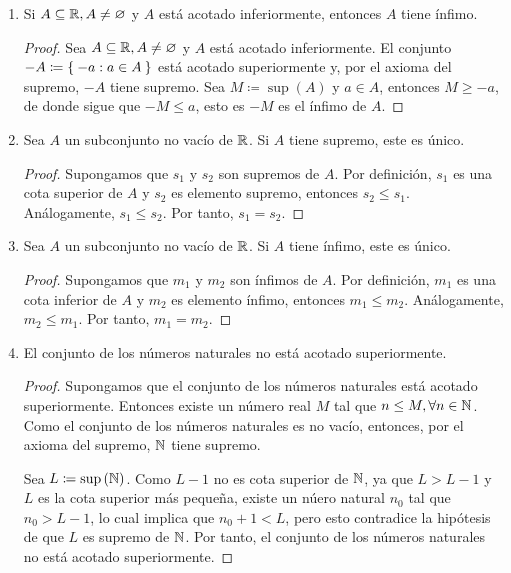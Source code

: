 \begin{enumerate}[label=\alph*)]
  \item Si $A\subseteq \mathbb{R}, A\neq \varnothing$ y $A$ está acotado inferiormente, entonces $A$ tiene ínfimo.
  \begin{proof}\leavevmode
    Sea $A\subseteq \mathbb{R}, A\neq \varnothing$ y $A$ está acotado inferiormente. El conjunto $-A \coloneqq \Set{-a: a\in A}$ está acotado superiormente y, por el axioma del supremo, $-A$ tiene supremo. Sea $M\coloneqq \sup{(A)}$ y $a\in A$, entonces $M\geq -a$, de donde sigue que $-M\leq a$, esto es $-M$ es el ínfimo de $A$.
  \end{proof}
  
  \item Sea $A$ un subconjunto no vacío de $\mathbb{R}$. Si $A$ tiene supremo, este es único.
 
  \begin{proof} 
   Supongamos que $s_1$ y $s_2$ son supremos de $A$. Por definición, $s_1$ es una cota superior de $A$ y $s_2$ es elemento supremo, entonces $s_2\leq s_1$. Análogamente, $s_1\leq s_2$. Por tanto, $s_1=s_2$.
  \end{proof}
 
  \item Sea $A$ un subconjunto no vacío de $\mathbb{R}$. Si $A$ tiene ínfimo, este es único.
  
  \begin{proof} 
   Supongamos que $m_1$ y $m_2$ son ínfimos de $A$. Por definición, $m_1$ es una cota inferior de $A$ y $m_2$ es elemento ínfimo, entonces $m_1\leq m_2$. Análogamente, $m_2\leq m_1$. Por tanto, $m_1=m_2$. 
  \end{proof}
  
  \item El conjunto de los números naturales no está acotado superiormente.
  \begin{proof}\leavevmode
    Supongamos que el conjunto de los números naturales está acotado superiormente. Entonces existe un número real $M$ tal que $n\leq M, \forall n\in \mathbb{N}$. Como el conjunto de los números naturales es no vacío, entonces, por el axioma del supremo, $\mathbb{N}$ tiene supremo.

    Sea $L\coloneqq \sup{(\mathbb{N})}$. Como $L-1$ no es cota superior de $\mathbb{N}$, ya que $L>L-1$ y $L$ es la cota superior más pequeña, existe un núero natural $n_0$ tal que $n_0>L-1$, lo cual implica que $n_0+1<L$, pero esto contradice la hipótesis	de que $L$ es supremo de $\mathbb{N}$. Por tanto, el conjunto de los números naturales no está acotado superiormente.
  \end{proof}
  

\end{enumerate}

